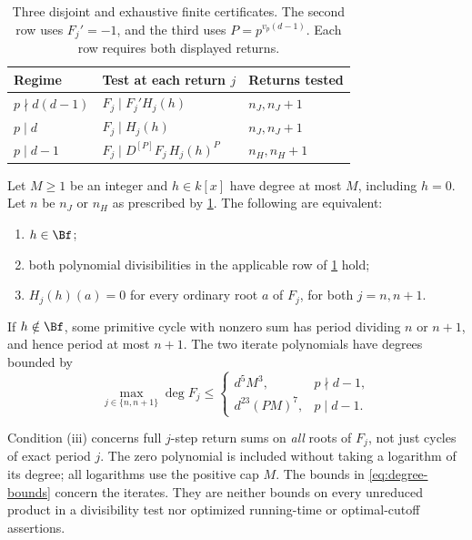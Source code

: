 \begin{table}[ht]
\centering
\small
\begin{tabular}{@{}lll@{}}
\toprule
Regime & Test at each return $j$ & Returns tested\\
\midrule
$p\nmid d(d-1)$ & $F_j\mid F_j'H_j(h)$ & $n_J,n_J+1$\\[2pt]
$p\mid d$ & $F_j\mid H_j(h)$ & $n_J,n_J+1$\\[2pt]
$p\mid d-1$ & $F_j\mid D^{[P]}F_j\,H_j(h)^P$ & $n_H,n_H+1$\\
\bottomrule
\end{tabular}
\caption{Three disjoint and exhaustive finite certificates.
The second row uses $F_j'=-1$, and the third uses
$P=p^{v_p(d-1)}$. Each row requires both displayed returns.}
\label{tab:tests}
\end{table}

\begin{theorem}
\label{thm:finite}
Let $M\ge1$ be an integer and $h\in k[x]$ have degree at most
$M$, including $h=0$. Let $n$ be $n_J$ or $n_H$ as prescribed
by \cref{tab:tests}. The following are equivalent:
\begin{enumerate}[label=\textup{(\roman*)}]
 \item $h\in\Bf$;
 \item both polynomial divisibilities in the applicable row of
       \cref{tab:tests} hold;
 \item $H_j(h)(a)=0$ for every ordinary root $a$ of $F_j$,
       for both $j=n,n+1$.
\end{enumerate}
If $h\notin\Bf$, some primitive cycle with nonzero sum has
period dividing $n$ or $n+1$, and hence period at most $n+1$.
The two iterate polynomials have degrees bounded by
\begin{equation}
 \max_{j\in\{n,n+1\}}\deg F_j\le
 \begin{cases}
  d^5M^3,&p\nmid d-1,\\
  d^{23}(PM)^7,&p\mid d-1.
 \end{cases}
 \label{eq:degree-bounds}
\end{equation}
\end{theorem}

Condition (iii) concerns full $j$-step return sums on \emph{all}
roots of $F_j$, not just cycles of exact period $j$. The zero
polynomial is included without taking a logarithm of its degree;
all logarithms use the positive cap $M$. The bounds in
\eqref{eq:degree-bounds} concern the iterates. They are neither
bounds on every unreduced product in a divisibility test nor
optimized running-time or optimal-cutoff assertions.

